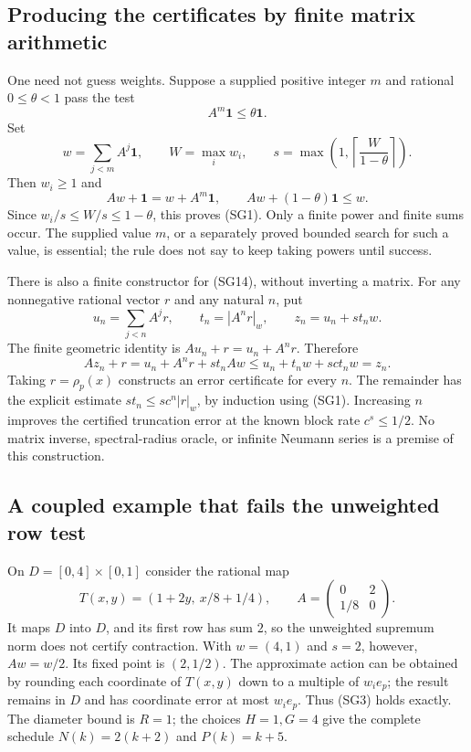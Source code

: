 \subsection{Producing the certificates by finite matrix arithmetic}

One need not guess weights.  Suppose a supplied positive integer $m$ and
rational $0\le\theta<1$ pass the test
\begin{equation}
 A^m\mathbf1\le\theta\mathbf1.                 \tag{SG17}
\end{equation}
Set
\[
 w=\sum_{j<m}A^j\mathbf1,\qquad W=\max_iw_i,
 \qquad s=\max\left(1,\left\lceil\frac{W}{1-\theta}\right\rceil\right).
\]
Then $w_i\ge1$ and
\[
 Aw+\mathbf1=w+A^m\mathbf1,
 \qquad Aw+(1-\theta)\mathbf1\le w.
\]
Since $w_i/s\le W/s\le1-\theta$, this proves (SG1).
Only a finite power and finite sums occur.  The supplied value $m$, or a
separately proved bounded search for such a value, is essential; the rule
does not say to keep taking powers until success.

There is also a finite constructor for (SG14), without inverting a matrix.
For any nonnegative rational vector $r$ and any natural $n$, put
\begin{equation}
 u_n=\sum_{j<n}A^jr,\qquad
 t_n=|A^nr|_w,\qquad z_n=u_n+s t_nw.             \tag{SG18}
\end{equation}
The finite geometric identity is
$Au_n+r=u_n+A^nr$.  Therefore
\[
 Az_n+r
 =u_n+A^nr+s t_nAw
 \le u_n+t_nw+sct_nw=z_n.
\]
Taking $r=\rho_p(x)$ constructs an error certificate for every $n$.
The remainder has the explicit estimate
$s t_n\le s c^n|r|_w$, by induction using (SG1).
Increasing $n$ improves the certified truncation error at the known block
rate $c^s\le1/2$.  No matrix inverse, spectral-radius oracle, or infinite
Neumann series is a premise of this construction.

\subsection{A coupled example that fails the unweighted row test}

On $D=[0,4]\times[0,1]$ consider the rational map
\[
 T(x,y)=(1+2y,\ x/8+1/4),\qquad
 A=\begin{pmatrix}0&2\\1/8&0\end{pmatrix}.
\]
It maps $D$ into $D$, and its first row has sum $2$, so the unweighted
supremum norm does not certify contraction.  With $w=(4,1)$ and $s=2$,
however, $Aw=w/2$.  Its fixed point is $(2,1/2)$.
The approximate action can be obtained by rounding each coordinate of
$T(x,y)$ down to a multiple of $w_ie_p$; the result remains in $D$ and
has coordinate error at most $w_ie_p$.  Thus (SG3) holds exactly.
The diameter bound is $R=1$; the choices $H=1,G=4$ give the complete
schedule $N(k)=2(k+2)$ and $P(k)=k+5$.

